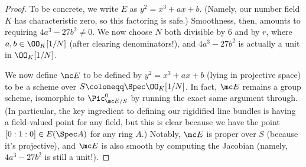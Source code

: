 \documentclass[../notes.tex]{subfiles}
\begin{document}
\begin{proof}
	To be concrete, we write $E$ as $y^2=x^3+ax+b$. (Namely, our number field $K$ has characteristic zero, so this factoring is safe.) Smoothness, then, amounts to requiring $4a^3-27b^2\ne0$. We now choose $N$ both divisible by $6$ and by $r$, where $a,b\in\OO_K[1/N]$ (after clearing denominators!), and $4a^3-27b^2$ is actually a unit in $\OO_K[1/N]$.

	We now define $\mc E$ to be defined by $y^2=x^3+ax+b$ (lying in projective space) to be a scheme over $S\coloneqq\Spec\OO_K[1/N]$. In fact, $\mc E$ remains a group scheme, isomorphic to $\Pic^0_{\mc E/S}$ by running the exact same argument through. (In particular, the key ingredient to defining our rigidified line bundles is having a field-valued point for any field, but this is clear because we have the point $[0:1:0]\in E(\Spec A)$ for any ring $A$.) Notably, $\mc E$ is proper over $S$ (because it's projective), and $\mc E$ is also smooth by computing the Jacobian (namely, $4a^3-27b^2$ is still a unit!).


\end{proof}
\end{document}
